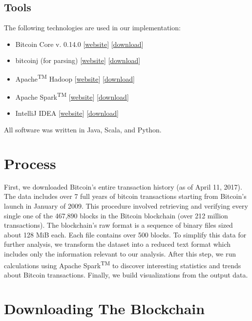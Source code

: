 \documentclass[9pt,twocolumn,twoside]{idsi}
\begin{document}
\subsection{Tools}
The following technologies are used in our implementation:
\begin{itemize}
    \item Bitcoin Core v. 0.14.0 [\href{https://bitcoin.org/en/bitcoin-core/}{website}] [\href{https://bitcoin.org/en/download}{download}]
    \item bitcoinj (for parsing) [\href{https://bitcoinj.github.io/}{website}] [\href{https://bitcoinj.github.io/#getting-started}{download}]
    \item Apache\textsuperscript{TM} Hadoop\textsuperscript{\textregistered} [\href{http://hadoop.apache.org}{website}] [\href{http://hadoop.apache.org/#Download+Hadoop}{download}]
    \item Apache Spark\textsuperscript{TM} [\href{http://spark.apache.org/}{website}] [\href{http://spark.apache.org/downloads.html}{download}]
    \item IntelliJ IDEA [\href{https://www.jetbrains.com/idea/}{website}] [\href{https://www.jetbrains.com/idea/download/}{download}]
\end{itemize}
All software was written in Java, Scala, and Python.

\section{Process}
First, we downloaded Bitcoin's entire transaction history (as of April 11, 2017). The data includes over 7 full years of bitcoin transactions starting from Bitcoin's launch in January of 2009. This procedure involved retrieving and verifying every single one of the 467,890 blocks in the Bitcoin blockchain (over 212 million transactions). The blockchain's raw format is a sequence of binary files sized about 128 MiB each. Each file contains over 500 blocks. To simplify this data for further analysis, we transform the dataset into a reduced text format which includes only the information relevant to our analysis. After this step, we run calculations using Apache Spark\textsuperscript{TM} to discover interesting statistics and trends about Bitcoin transactions. Finally, we build visualizations from the output data.

\section{Downloading The Blockchain}
\end{document}
